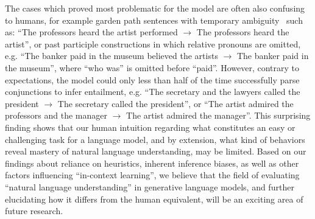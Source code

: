 \documentclass[11pt]{article}
\begin{document}
The cases which proved most problematic for the model are often also confusing to humans, for example garden path sentences with temporary ambiguity~\cite{frazier_sausage_1978} such as: ``The professors heard the artist performed $\rightarrow$ The professors heard the artist'', or past participle constructions in which relative pronouns are omitted, e.g. ``The banker paid in the museum believed the artists $\rightarrow$ The banker paid in the museum'', where ``who was'' is omitted before ``paid''. However, contrary to expectations, the model could only less than half of the time successfully parse conjunctions to infer entailment, e.g. ``The secretary and the lawyers called the president $\rightarrow$ The secretary called the president'', or ``The artist admired the professors and the manager $\rightarrow$ The artist admired the manager''. This surprising finding shows that our human intuition regarding what constitutes an easy or challenging task for a language model, and by extension, what kind of behaviors reveal mastery of natural language understanding, may be limited. Based on our findings about reliance on heuristics, inherent inference biases, as well as other factors influencing ``in-context learning'', we believe that the field of evaluating ``natural language understanding'' in generative language models, and further elucidating how it differs from the human equivalent, will be an exciting area of future research.
\end{document}
